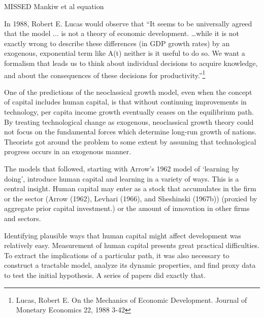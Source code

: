  MISSED Mankiw et al equation 

In 1988, Robert E. Lucas would observe that ``It seems to be universally agreed that the model ... is not a theory of economic development.   \dots while it is not exactly wrong to describe these differences (in GDP  growth rates) by an exogenous, exponential term like A(t) neither is it useful to do so. We want a formalism that leads us to think about individual decisions to acquire knowledge, and about the consequences of these decisions for productivity.''\footnote{Lucas,  Robert E. On the Mechanics of Economic Development. Journal of Monetary Economics 22, 1988 3-42} 




One of the predictions of the neoclassical growth model, even  when the concept of capital includes human capital, is that without  continuing improvements in technology, per capita income growth eventually ceases on the equilibrium path. 
By treating technological change as exogenous, neoclassical growth theory could not focus on the fundamental forces which determine long-run growth of nations. Theorists got around the problem to some extent by assuming that technological progress occurs in an exogenous manner. 

The models that followed, starting with Arrow's  1962 model of `learning by doing', introduce human capital and learning in a variety of ways. This is a central insight. Human capital may enter  as a stock that accumulates in the firm or the sector (Arrow (1962), Levhari (1966), and Sheshinski (1967b)) (proxied by aggregate prior capital investment.)
or the amount of innovation in other firms and sectors. %


Identifying  plausible ways that human capital might affect development was relatively easy. Measurement of human capital presents great practical difficulties. To extract the implications of a particular path, it was also necessary to construct a tractable model, analyze its dynamic properties, and find proxy data to test the initial hypothesis.   A series of papers did exactly that.

